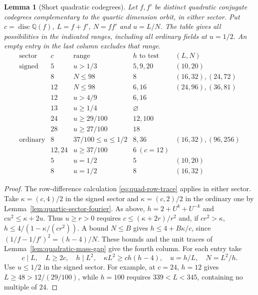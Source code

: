 \documentclass[11pt,reqno]{amsart}
\newtheorem{lemma}[theorem]{Lemma}
\theoremstyle{remark}\newtheorem{remark}[theorem]{Remark}
\numberwithin{equation}{section}
\begin{document}
\begin{lemma}[Short quadratic codegrees]\label{lem:quartic-short-pairs}
Let $f,f'$ be distinct quadratic conjugate codegrees complementary
to the quartic dimension orbit, in either sector. Put
$c=\operatorname{disc}\mathbb Q(f)$, $L=f+f'$, $N=ff'$ and
$u=L/N$. The table gives all possibilities in the indicated ranges,
including all ordinary fields at $u=1/2$. An empty entry in the last
column excludes that range.
\[
\begin{array}{c|c|l|l|l}
 \text{sector}&c&\text{range}&h\text{ to test}&(L,N)\\\hline
 \text{signed}&5&u>1/3&5,9,20&(10,20)\\
 &8&N\le98&8&(16,32),(24,72)\\
 &12&N\le98&6,16&(24,96),(36,81)\\
 &12&u>4/9&6,16&\\
 &13&u\ge1/4&\varnothing&\\
 &24&u\ge29/100&12,100&\\
 &28&u\ge27/100&18&\\\hline
 \text{ordinary}&8&37/100\le u\le1/2&8,36&(16,32),(96,256)\\
 &12,24&u\ge37/100&6\ (c=12)&\\
 &5&u=1/2&5&(10,20)\\
 &8&u=1/2&8&(16,32)
\end{array}
\]
\end{lemma}
\begin{proof}
The row-difference calculation \eqref{eq:quad-row-trace} applies
in either sector. Take $\kappa=(c,4)/2$ in the signed sector and
$\kappa=(c,2)/2$ in the ordinary one by Lemma~\ref{lem:quartic-sector-fourier}. As above, $h=2+U^k+U^{-k}$
and $c u^2\le\kappa+2u$. Thus $u\ge r>0$ requires
$c\le(\kappa+2r)/r^2$ and, if $c r^2>\kappa$,
$h\le4/(1-\kappa/(c r^2))$. A bound $N\le B$ gives
$h\le4+B\kappa/c$, since $(1/f-1/f')^2=(h-4)/N$.
These bounds and the unit traces of Lemma~\ref{lem:quadratic-mass-gap}
give the fourth column. For each entry take
\[
 c\mid L,\quad L\ge2c,\quad h\mid L^2,\quad
 \kappa L^2\ge c h(h-4),\quad u=h/L,\quad N=L^2/h.
\]
Use $u\le1/2$ in the signed sector. For example, at $c=24$,
$h=12$ gives $L\ge48>12/(29/100)$, while $h=100$ requires
$339<L<345$, containing no multiple of $24$.
\end{proof}
\end{document}

